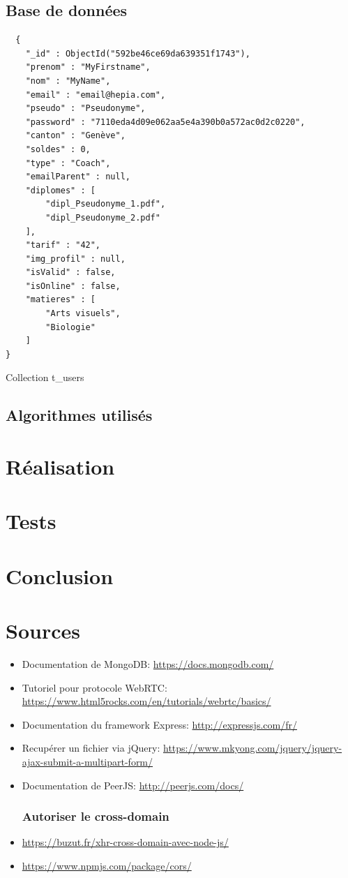 \documentclass[a4paper]{scrreprt}
\begin{document}
\section{Base de données}

\begin{listing}[H]
\begin{verbatim}
  {
    "_id" : ObjectId("592be46ce69da639351f1743"),
    "prenom" : "MyFirstname",
    "nom" : "MyName",
    "email" : "email@hepia.com",
    "pseudo" : "Pseudonyme",
    "password" : "7110eda4d09e062aa5e4a390b0a572ac0d2c0220",
    "canton" : "Genève",
    "soldes" : 0,
    "type" : "Coach",
    "emailParent" : null,
    "diplomes" : [ 
        "dipl_Pseudonyme_1.pdf", 
        "dipl_Pseudonyme_2.pdf"
    ],
    "tarif" : "42",
    "img_profil" : null,
    "isValid" : false,
    "isOnline" : false,
    "matieres" : [ 
        "Arts visuels", 
        "Biologie"
    ]
}
\end{verbatim}
\caption{Collection t\_users}
\label{lst:col_users}
\end{listing}


\section{Algorithmes utilisés}

\chapter{Réalisation}
\chapter{Tests}

\chapter{Conclusion}

\chapter{Sources}
\begin{itemize}[label=\textbullet]
\item Documentation de MongoDB: \url{https://docs.mongodb.com/}
\item Tutoriel pour protocole WebRTC: \url{https://www.html5rocks.com/en/tutorials/webrtc/basics/}
\item Documentation du framework Express: \url{http://expressjs.com/fr/}
\item Recupérer un fichier via jQuery: \url{https://www.mkyong.com/jquery/jquery-ajax-submit-a-multipart-form/}
\item Documentation de PeerJS: \url{http://peerjs.com/docs/}
\subsection*{Autoriser le cross-domain}
\item \url{https://buzut.fr/xhr-cross-domain-avec-node-js/}
\item \url{https://www.npmjs.com/package/cors/}
\end{itemize}
\end{document}
